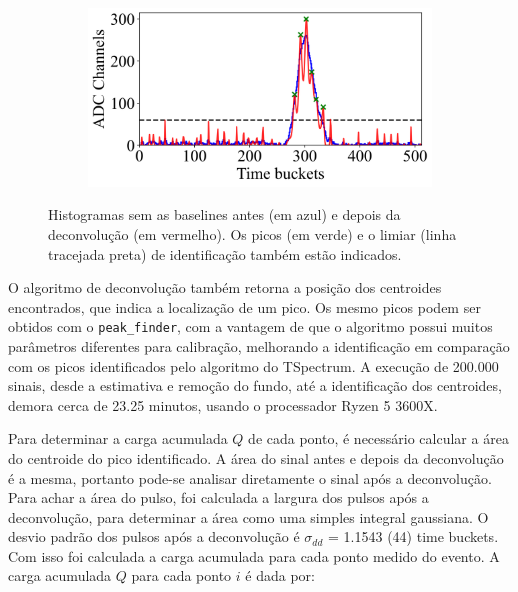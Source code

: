 \documentclass[a4paper,12pt,oneside]{book}
\begin{document}
\begin{figure}[H]
\begin{subfigure}[b]{0.48\textwidth}
        \caption{}
        \label{subfig:ex_sinal_deconv_3}
    \end{subfigure}%
    \hfill
    \begin{subfigure}[b]{0.48\textwidth}
        \centering
        \includegraphics[scale=0.40]{figs/ex_deconv_4.png}
        \caption{}
        \label{subfig:ex_sinal_deconv_4}
    \end{subfigure}
\caption{Histogramas sem as baselines antes (em azul) e depois da deconvolução (em vermelho). Os picos (em verde) e o limiar (linha tracejada preta) de identificação também estão indicados.}
\label{fig:ex_sinal_deconv}
\end{figure}

\par O algoritmo de deconvolução também retorna a posição dos centroides encontrados, que indica a localização de um pico. Os mesmo picos podem ser obtidos com o \texttt{peak\_finder}, com a vantagem de que o algoritmo possui muitos parâmetros diferentes para calibração, melhorando a identificação em comparação com os picos identificados pelo algoritmo do TSpectrum. A execução de 200.000 sinais, desde a estimativa e remoção do fundo, até a identificação dos centroides, demora cerca de 23.25 minutos, usando o processador Ryzen 5 3600X.

\par Para determinar a carga acumulada $Q$ de cada ponto, é necessário calcular a área do centroide do pico identificado. A área do sinal antes e depois da deconvolução é a mesma, portanto pode-se analisar diretamente o sinal após a deconvolução. Para achar a área do pulso, foi calculada a largura dos pulsos após a deconvolução, para determinar a área como uma simples integral gaussiana. O desvio padrão dos pulsos após a deconvolução é $\sigma_{dd}$ = 1.1543 (44) time buckets. Com isso foi calculada a carga acumulada para cada ponto medido do evento. A carga acumulada $Q$ para cada ponto $i$ é dada por:
\end{document}
